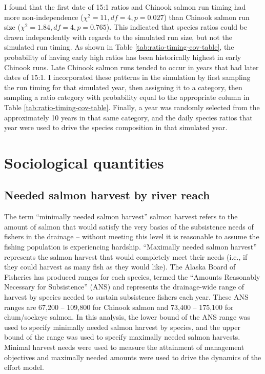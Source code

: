 \documentclass[12pt,]{book}
\theoremstyle{definition}
\theoremstyle{definition}
\theoremstyle{definition}
\theoremstyle{remark}
\begin{document}
I found that the first date of 15:1 ratios and Chinook salmon run timing
had more non-independence (\(\chi^2 = 11, df = 4, p = 0.027\)) than
Chinook salmon run size (\(\chi^2 = 1.84, df = 4, p = 0.765\)). This
indicated that species ratios could be drawn independently with regards
to the simulated run size, but not the simulated run timing. As shown in
Table \ref{tab:ratio-timing-cov-table}, the probability of having early
high ratios has been historically highest in early Chinook runs. Late
Chinook salmon runs tended to occur in years that had later dates of
15:1. I incorporated these patterns in the simulation by first sampling
the run timing for that simulated year, then assigning it to a category,
then sampling a ratio category with probability equal to the appropriate
column in Table \ref{tab:ratio-timing-cov-table}. Finally, a year was
randomly selected from the approximately 10 years in that same category,
and the daily species ratios that year were used to drive the species
composition in that simulated year.

\section{Sociological quantities}\label{sociological-quantities}

\subsection{Needed salmon harvest by river reach}\label{mse-data-needs}

\noindent
The term ``minimally needed salmon harvest'' salmon harvest refers to
the amount of salmon that would satisfy the very basics of the
subsistence needs of fishers in the drainage -- without meeting this
level it is reasonable to assume the fishing population is experiencing
hardship. ``Maximally needed salmon harvest'' represents the salmon
harvest that would completely meet their needs (i.e., if they could
harvest as many fish as they would like). The Alaska Board of Fisheries
has produced ranges for each species, termed the ``Amounts Reasonably
Necessary for Subsistence'' (ANS) and represents the drainage-wide range
of harvest by species needed to sustain subsistence fishers each year.
These ANS ranges are 67,200 -- 109,800 for Chinook salmon and 73,400 --
175,100 for chum/sockeye salmon. In this analysis, the lower bound of
the ANS range was used to specify minimally needed salmon harvest by
species, and the upper bound of the range was used to specify maximally
needed salmon harvests. Minimal harvest needs were used to measure the
attainment of management objectives and maximally needed amounts were
used to drive the dynamics of the effort model.
\end{document}
